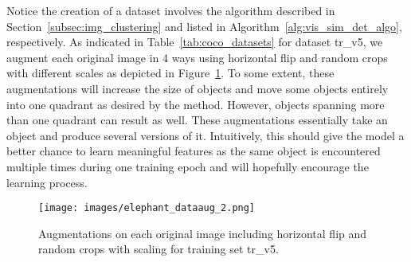 \documentclass[a4paper,12pt]{report}
\begin{document}
\begin{table}[ht!]
\centering
{}
\caption{COCO training and test datasets used for LORBMS.} \label{tab:coco_datasets}
\end{table}
Notice the creation of a dataset involves the algorithm described in Section~\ref{subsec:img_clustering} and listed in Algorithm~\ref{alg:vis_sim_det_algo}, respectively. As indicated in Table~\ref{tab:coco_datasets} for dataset tr\_v5, we augment each original image in 4 ways using horizontal flip and random crops with different scales as depicted in Figure~\ref{fig:dataaug_elephant}. To some extent, these augmentations will increase the size of objects and move some objects entirely into one quadrant as desired by the method. However, objects spanning more than one quadrant can result as well. These augmentations essentially take an object and produce several versions of it. Intuitively, this should give the model a better chance to learn meaningful features as the same object is encountered multiple times during one training epoch and will hopefully encourage the learning process.
\begin{figure}[ht]
\centering
\texttt{[image: images/elephant\_dataaug\_2.png]}
\caption{Augmentations on each original image including horizontal flip and random crops with scaling for training set tr\_v5.}
\label{fig:dataaug_elephant}
\end{figure}
\end{document}
